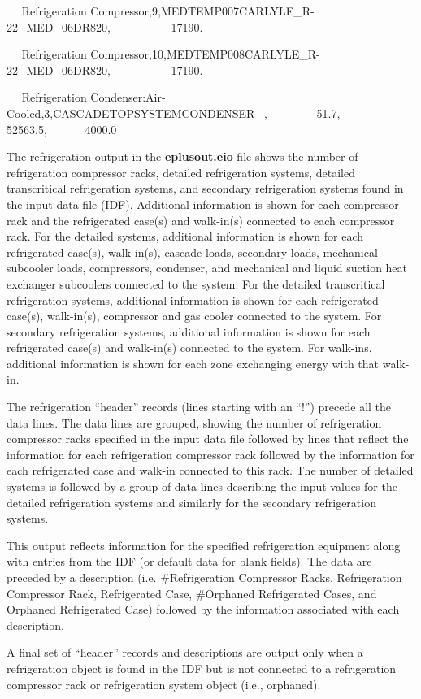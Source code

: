 ~~ Refrigeration Compressor,9,MEDTEMP007CARLYLE\_R-22\_MED\_06DR820,~~~~~~~~~~ 17190.

~~ Refrigeration Compressor,10,MEDTEMP008CARLYLE\_R-22\_MED\_06DR820,~~~~~~~~~~ 17190.

~~ Refrigeration Condenser:Air-Cooled,3,CASCADETOPSYSTEMCONDENSER~ ,~~~~~~~~ 51.7,~~~~~ 52563.5,~~~~~~ 4000.0

The refrigeration output in the \textbf{eplusout.eio} file shows the number of refrigeration compressor racks, detailed refrigeration systems, detailed transcritical refrigeration systems, and secondary refrigeration systems found in the input data file (IDF). Additional information is shown for each compressor rack and the refrigerated case(s) and walk-in(s) connected to each compressor rack. For the detailed systems, additional information is shown for each refrigerated case(s), walk-in(s), cascade loads, secondary loads, mechanical subcooler loads, compressors, condenser, and mechanical and liquid suction heat exchanger subcoolers connected to the system. For the detailed transcritical refrigeration systems, additional information is shown for each refrigerated case(s), walk-in(s), compressor and gas cooler connected to the system. For secondary refrigeration systems, additional information is shown for each refrigerated case(s) and walk-in(s) connected to the system. For walk-ins, additional information is shown for each zone exchanging energy with that walk-in.

The refrigeration ``header'' records (lines starting with an ``!'') precede all the data lines. The data lines are grouped, showing the number of refrigeration compressor racks specified in the input data file followed by lines that reflect the information for each refrigeration compressor rack followed by the information for each refrigerated case and walk-in connected to this rack. The number of detailed systems is followed by a group of data lines describing the input values for the detailed refrigeration systems and similarly for the secondary refrigeration systems.

This output reflects information for the specified refrigeration equipment along with entries from the IDF (or default data for blank fields). The data are preceded by a description (i.e. \#Refrigeration Compressor Racks, Refrigeration Compressor Rack, Refrigerated Case, \#Orphaned Refrigerated Cases, and Orphaned Refrigerated Case) followed by the information associated with each description.

A final set of ``header'' records and descriptions are output only when a refrigeration object is found in the IDF but is not connected to a refrigeration compressor rack or refrigeration system object (i.e., orphaned).

